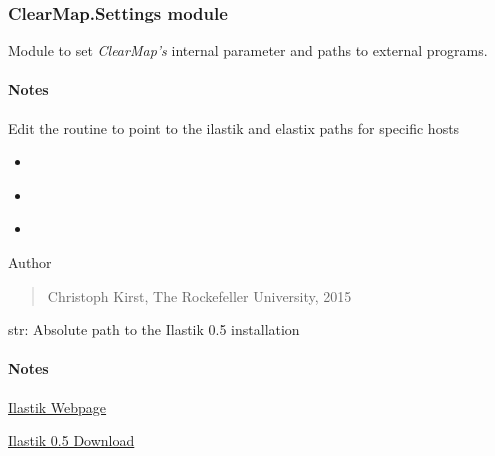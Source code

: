 \documentclass[letterpaper,10pt,english]{sphinxmanual}
\begin{document}
\subsubsection{ClearMap.Settings module}
\label{api/ClearMap.Settings:clearmap-settings-module}\label{api/ClearMap.Settings::doc}\label{api/ClearMap.Settings:module-ClearMap.Settings}
Module to set \emph{ClearMap's} internal parameter and paths to external programs.
\paragraph{Notes}

Edit the {\hyperref[api/ClearMap.Settings:ClearMap.Settings.setup]{\emph{}}} routine to point to the ilastik and elastix paths
for specific hosts



\begin{itemize}
\item {} 
{\hyperref[api/ClearMap.Settings:ClearMap.Settings.IlastikPath]{\emph{}}}

\item {} 
{\hyperref[api/ClearMap.Settings:ClearMap.Settings.ElastixPath]{\emph{}}}

\item {} 
{\hyperref[api/ClearMap.Parameter:module-ClearMap.Parameter]{\emph{}}}

\end{itemize}



Author
\begin{quote}

Christoph Kirst, The Rockefeller University, 2015
\end{quote}

\begin{fulllineitems}
\label{api/ClearMap.Settings:ClearMap.Settings.IlastikPath}
str: Absolute path to the Ilastik 0.5 installation
\paragraph{Notes}

\href{http://ilastik.org/}{Ilastik Webpage}

\href{http://old.ilastik.org/}{Ilastik 0.5 Download}

\end{fulllineitems}
\end{document}
